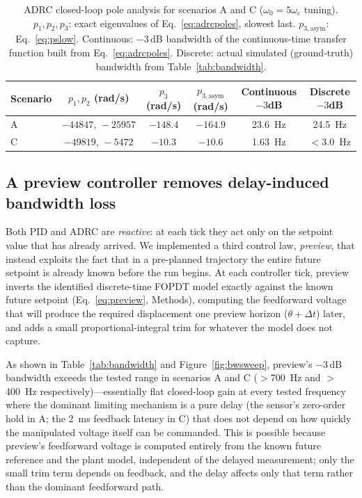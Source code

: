 \documentclass[fleqn,10pt]{wlscirep}
\begin{document}
\begin{table}[ht]
    \centering
    \caption{ADRC closed-loop pole analysis for scenarios A and C ($\omega_0=5\omega_c$ tuning). $p_1,p_2,p_3$: exact eigenvalues of Eq.~\ref{eq:adrcpoles}, slowest last. $p_{3,\text{asym}}$: Eq.~\ref{eq:pslow}. Continuous: $-3$\,dB bandwidth of the continuous-time transfer function built from Eq.~\ref{eq:adrcpoles}. Discrete: actual simulated (ground-truth) bandwidth from Table~\ref{tab:bandwidth}.}
    \label{tab:poles}
    \begin{tabular}{lccccc}
        \toprule
        Scenario & $p_1,p_2$ (rad/s) & $p_3$ (rad/s) & $p_{3,\text{asym}}$ (rad/s) & Continuous $-3$dB & Discrete $-3$dB \\
        \midrule
        A & $-44847,\,-25957$ & $-148.4$ & $-164.9$ & \SI{23.6}{Hz} & \SI{24.5}{Hz} \\
        C & $-49819,\,-5472$  & $-10.3$  & $-10.6$  & \SI{1.63}{Hz} & $<$\SI{3.0}{Hz} \\
        \bottomrule
    \end{tabular}
\end{table}

\subsection*{A preview controller removes delay-induced bandwidth loss}

Both PID and ADRC are \emph{reactive}: at each tick they act only on the setpoint value that has already arrived. We implemented a third control law, \emph{preview}, that instead exploits the fact that in a pre-planned trajectory the entire future setpoint is already known before the run begins. At each controller tick, preview inverts the identified discrete-time FOPDT model exactly against the known future setpoint (Eq.~\ref{eq:preview}, Methods), computing the feedforward voltage that will produce the required displacement one preview horizon ($\theta + \Delta t$) later, and adds a small proportional-integral trim for whatever the model does not capture.

As shown in Table~\ref{tab:bandwidth} and Figure~\ref{fig:bwsweep}, preview's $-3$\,dB bandwidth exceeds the tested range in scenarios A and C ($>$\SI{700}{Hz} and $>$\SI{400}{Hz} respectively)---essentially flat closed-loop gain at every tested frequency where the dominant limiting mechanism is a pure delay (the sensor's zero-order hold in A; the \SI{2}{ms} feedback latency in C) that does not depend on how quickly the manipulated voltage itself can be commanded. This is possible because preview's feedforward voltage is computed entirely from the known future reference and the plant model, independent of the delayed measurement; only the small trim term depends on feedback, and the delay affects only that term rather than the dominant feedforward path.
\end{document}
